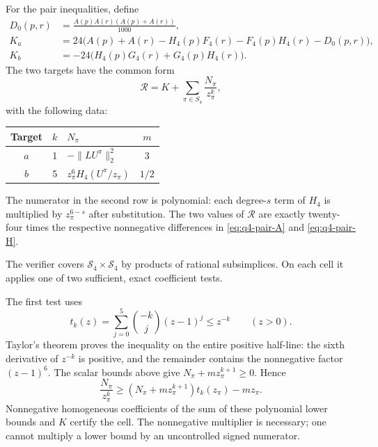 For the pair inequalities, define
\begin{align*}
 D_0(p,r)&=\frac{A(p)A(r)(A(p)+A(r))}{1000},\\
 K_a&=24\bigl(A(p)+A(r)-H_4(p)F_4(r)-F_4(p)H_4(r)-D_0(p,r)\bigr),\\
 K_b&=-24\bigl(H_4(p)G_4(r)+G_4(p)H_4(r)\bigr).
\end{align*}
The two targets have the common form
\begin{equation}
 \mathcal R=K+\sum_{\pi\in S_4}\frac{N_\pi}{z_\pi^k},
 \label{eq:q4-rational-target}
\end{equation}
with the following data:
\begin{center}
\begin{tabular}{cclc}
\hline
Target & $k$ & $N_\pi$ & $m$\\
\hline
$a$ & 1 & $-\lVert LU^\pi\rVert_2^2$ & $3$\\
$b$ & 5 & $z_\pi^6H_4(U^\pi/z_\pi)$ & $1/2$\\
\hline
\end{tabular}
\end{center}
The numerator in the second row is polynomial: each degree-$s$ term of
$H_4$ is multiplied by $z_\pi^{6-s}$ after substitution.  The two values of
$\mathcal R$ are exactly twenty-four times the respective nonnegative
differences in \eqref{eq:q4-pair-A} and \eqref{eq:q4-pair-H}.

The verifier covers $\mathcal S_4\times\mathcal S_4$ by products of rational
subsimplices.  On each cell it applies one of two sufficient, exact
coefficient tests.

The first test uses
\[
 t_k(z)=\sum_{j=0}^5\binom{-k}{j}(z-1)^j\le z^{-k}
 \qquad(z>0).
\]
Taylor's theorem proves the inequality on the entire positive half-line:
the sixth derivative of $z^{-k}$ is positive, and the remainder contains
the nonnegative factor $(z-1)^6$.  The scalar bounds above give
$N_\pi+m z_\pi^{k+1}\ge0$.  Hence
\[
 \frac{N_\pi}{z_\pi^k}
 \ge (N_\pi+m z_\pi^{k+1})t_k(z_\pi)-m z_\pi.
\]
Nonnegative homogeneous coefficients of the sum of these polynomial lower
bounds and $K$ certify the cell.  The nonnegative multiplier is necessary;
one cannot multiply a lower bound by an uncontrolled signed numerator.

